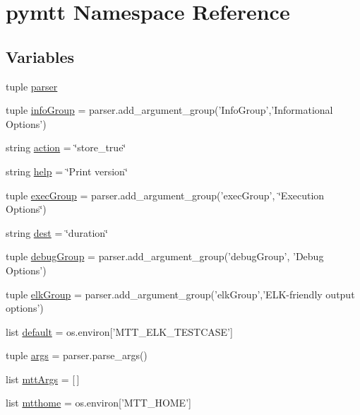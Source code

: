\hypertarget{namespacepymtt}{\section{pymtt Namespace Reference}
\label{namespacepymtt}
}
\subsection*{Variables}
\begin{DoxyCompactItemize}
\item 
tuple \hyperlink{namespacepymtt_a95d54fdad48aac280be9d57cf81dee68}{parser}
\item 
tuple \hyperlink{namespacepymtt_a99ad2929ecc4e17f97670bed44f08c35}{info\-Group} = parser.\-add\-\_\-argument\-\_\-group('Info\-Group','Informational Options')
\item 
string \hyperlink{namespacepymtt_a5ee564a034624d925bb8dc823d11c522}{action} = \char`\"{}store\-\_\-true\char`\"{}
\item 
string \hyperlink{namespacepymtt_a21e88c39af91deb569da20633d245b09}{help} = \char`\"{}Print version\char`\"{}
\item 
tuple \hyperlink{namespacepymtt_a0f52dbd5d46583e466305a708dea64a1}{exec\-Group} = parser.\-add\-\_\-argument\-\_\-group('exec\-Group', \char`\"{}Execution Options\char`\"{})
\item 
string \hyperlink{namespacepymtt_a9ecea46ee6082edb9bbdd8393829e18e}{dest} = \char`\"{}duration\char`\"{}
\item 
tuple \hyperlink{namespacepymtt_af066a010075617c13a5595243ceb9041}{debug\-Group} = parser.\-add\-\_\-argument\-\_\-group('debug\-Group', 'Debug Options')
\item 
tuple \hyperlink{namespacepymtt_aace1bea66474191731e447b6d89fe82b}{elk\-Group} = parser.\-add\-\_\-argument\-\_\-group('elk\-Group','E\-L\-K-\/friendly output options')
\item 
list \hyperlink{namespacepymtt_ae5dcbc541ed4eb4b84f0b2a82e858395}{default} = os.\-environ\mbox{[}'M\-T\-T\-\_\-\-E\-L\-K\-\_\-\-T\-E\-S\-T\-C\-A\-S\-E'\mbox{]}
\item 
tuple \hyperlink{namespacepymtt_af7633cc372f3357c4f8e6f8dedfe7a8e}{args} = parser.\-parse\-\_\-args()
\item 
list \hyperlink{namespacepymtt_a7dea31bd26744bab0b1c30dc11c718aa}{mtt\-Args} = \mbox{[}$\,$\mbox{]}
\item 
list \hyperlink{namespacepymtt_a109ef76f074b08666398bf6a38219cfc}{mtthome} = os.\-environ\mbox{[}'M\-T\-T\-\_\-\-H\-O\-M\-E'\mbox{]}

\end{DoxyCompactItemize}
